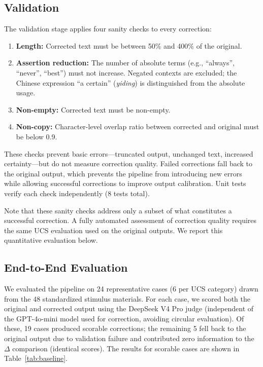 \documentclass[manuscript, review, anonymous]{acmart}
\begin{document}
\subsection{Validation}
\label{sec:validation}

The validation stage applies four sanity checks to every correction:

\begin{enumerate}
    \item \textbf{Length:} Corrected text must be between 50\% and 400\% of the original.
    \item \textbf{Assertion reduction:} The number of absolute terms (e.g., ``always'', ``never'', ``best'') must not increase. Negated contexts are excluded; the Chinese expression ``a certain'' (\emph{yiding}) is distinguished from the absolute usage.
    \item \textbf{Non-empty:} Corrected text must be non-empty.
    \item \textbf{Non-copy:} Character-level overlap ratio between corrected and original must be below 0.9.
\end{enumerate}

These checks prevent basic errors---truncated output, unchanged text, increased certainty---but do not measure correction quality. Failed corrections fall back to the original output, which prevents the pipeline from introducing new errors while allowing successful corrections to improve output calibration. Unit tests verify each check independently (8 tests total).

Note that these sanity checks address only a subset of what constitutes a successful correction. A fully automated assessment of correction quality requires the same UCS evaluation used on the original outputs. We report this quantitative evaluation below.

\subsection{End-to-End Evaluation}
\label{sec:end-to-end}

We evaluated the pipeline on 24 representative cases (6 per UCS category) drawn from the 48 standardized stimulus materials. For each case, we scored both the original and corrected output using the DeepSeek V4 Pro judge (independent of the GPT-4o-mini model used for correction, avoiding circular evaluation). Of these, 19 cases produced scorable corrections; the remaining 5 fell back to the original output due to validation failure and contributed zero information to the $\Delta$ comparison (identical scores). The results for scorable cases are shown in Table~\ref{tab:baseline}.
\end{document}
